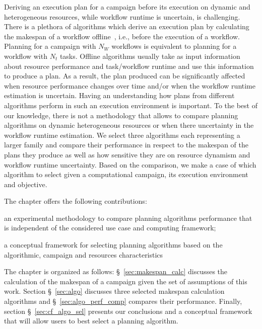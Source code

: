 Deriving an execution plan for a campaign before its execution on dynamic and 
heterogeneous resources, while workflow runtime is uncertain, is challenging.
There is a plethora of algorithms which derive an execution plan by 
calculating the makespan of a workflow offline~\cite{lu2019review}, i.e., 
before the execution of a workflow. Planning for a campaign with $N_W$ 
workflows is equivalent to planning for a workflow with $N_t$ tasks. Offline 
algorithms usually take as input information about resource performance and 
task/workflow runtime and use this information to produce a plan. As a result, 
the plan produced can be significantly affected when resource performance 
changes over time and/or when the workflow runtime estimation is uncertain.
Having an understanding how plans from different algorithms perform in such an 
execution environment is important. To the best of our knowledge, there is not 
a methodology that allows to compare planning algorithms on dynamic 
heterogeneous resources or when there uncertainty in the workflow runtime 
estimation. We select three algorithms each representing a larger family and 
compare their performance in respect to the makespan of the plans they produce 
as well as how sensitive they are on resource dynamism and workflow runtime 
uncertainty. Based on the comparison, we make a case of which algorithm to 
select given a computational campaign, its execution environment and objective.

The chapter offers the following contributions:
\begin{inparaenum}[i)]
    \item an experimental methodology to compare planning algorithms 
    performance that is independent of the considered use case and computing 
    framework;
    \item a conceptual framework for selecting planning algorithms based on 
    the algorithmic, campaign and resources characteristics
\end{inparaenum}

The chapter is organized as follows: \S~\ref{sec:makespan_calc} discusses the 
calculation of the makespan of a campaign given the set of assumptions of this 
work. Section \S~\ref{sec:algo} discusses three selected makespan calculation 
algorithms and \S~\ref{sec:algo_perf_comp} compares their performance. 
Finally, section \S~\ref{sec:cf_algo_sel} presents our conclusions and a 
conceptual framework that will allow users to best select a planning algorithm.

